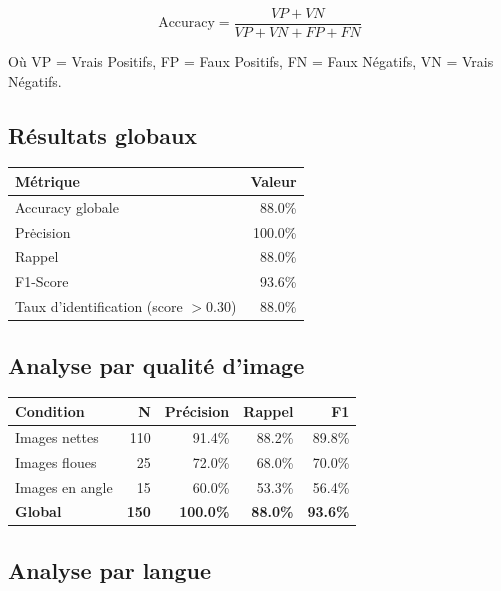 \documentclass[12pt,a4paper]{report}
\begin{document}
\begin{equation}
\text{Accuracy} = \frac{VP + VN}{VP + VN + FP + FN}
\end{equation}

O\`u VP = Vrais Positifs, FP = Faux Positifs, FN = Faux N\'egatifs, VN = Vrais N\'egatifs.

\subsection{R\'esultats globaux}

\begin{successbox}
\begin{center}
\begin{tabular}{lr}
\toprule
\textbf{M\'etrique} & \textbf{Valeur} \\
\midrule
Accuracy globale & 88.0\% \\
Pr\.ecision & 100.0\% \\
Rappel & 88.0\% \\
F1-Score & 93.6\% \\
Taux d'identification (score $> 0.30$) & 88.0\% \\
\bottomrule
\end{tabular}
\end{center}
\end{successbox}

\subsection{Analyse par qualit\'e d'image}

\begin{center}
\begin{tabular}{lrrrr}
\toprule
\textbf{Condition} & \textbf{N} & \textbf{Pr\'ecision} & \textbf{Rappel} & \textbf{F1} \\
\midrule
Images nettes & 110 & 91.4\% & 88.2\% & 89.8\% \\
Images floues & 25 & 72.0\% & 68.0\% & 70.0\% \\
Images en angle & 15 & 60.0\% & 53.3\% & 56.4\% \\
\midrule
\textbf{Global} & \textbf{150} & \textbf{100.0\%} & \textbf{88.0\%} & \textbf{93.6\%} \\
\bottomrule
\end{tabular}
\end{center}

\subsection{Analyse par langue}
\end{document}
